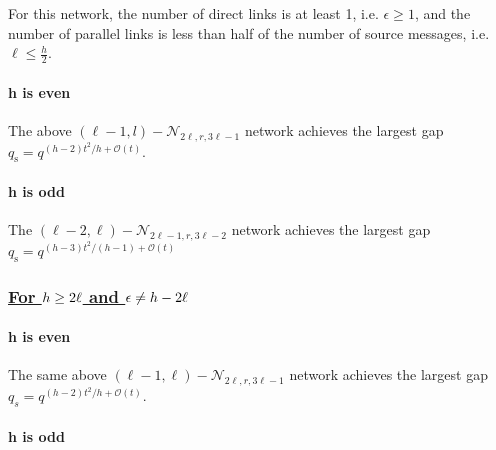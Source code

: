 For this network, the number of direct links is at least 1, i.e. $\epsilon\geq1$,
and the number of parallel links is less than half of the number of
source messages, i.e. $\ell\leq\frac{h}{2}$.

\paragraph{h is even}

The above $\left(\ell-1,l\right)-\mathcal{N}_{2\ell,r,3\ell-1}$ network
achieves the largest gap $q_{\mathrm{s}}=q^{(h-2)t^{2}/h+\mathcal{O}(t)}$.

\paragraph{h is odd}

The $\left(\ell-2,\ell\right)-\mathcal{N}_{2\ell-1,r,3\ell-2}$ network
achieves the largest gap $q_{\mathrm{s}}=q^{\left(h-3\right)t^{2}/\left(h-1\right)+\mathcal{O}(t)}$

\subsubsection{\uline{For \mbox{$h\protect\geq2\ell$} and \mbox{$\epsilon\protect\neq h-2\ell$}}}

\paragraph{h is even}

The same above $\left(\ell-1,\ell\right)-\mathcal{N}_{2\ell,r,3\ell-1}$
network achieves the largest gap $q_{s}=q^{(h-2)t^{2}/h+\mathcal{O}(t)}$.

\paragraph{h is odd}


